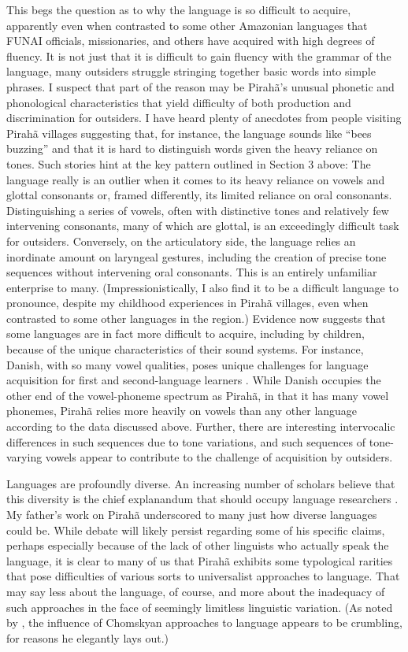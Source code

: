 \documentclass[output=paper,colorlinks,citecolor=brown
]{langscibook}
\begin{document}
    This begs the question as to why the language is so difficult to acquire, apparently even when contrasted to some other Amazonian languages that FUNAI officials, missionaries, and others have acquired with high degrees of fluency. It is not just that it is difficult to gain fluency with the grammar of the language, many outsiders struggle stringing together basic words into simple phrases. I suspect that part of the reason may be Pirahã’s unusual phonetic and phonological characteristics that yield difficulty of both production and discrimination for outsiders. I have heard plenty of anecdotes from people visiting Pirahã villages suggesting that, for instance, the language sounds like “bees buzzing” and that it is hard to distinguish words given the heavy reliance on tones. Such stories hint at the key pattern outlined in Section 3 above: The language really is an outlier when it comes to its heavy reliance on vowels and glottal consonants or, framed differently, its limited reliance on oral consonants. Distinguishing a series of vowels, often with distinctive tones and relatively few intervening consonants, many of which are glottal, is an exceedingly difficult task for outsiders. Conversely, on the articulatory side, the language relies an inordinate amount on laryngeal gestures, including the creation of precise tone sequences without intervening oral consonants. This is an entirely unfamiliar enterprise to many. (Impressionistically, I also find it to be a difficult language to pronounce, despite my childhood experiences in Pirahã villages, even when contrasted to some other languages in the region.) Evidence now suggests that some languages are in fact more difficult to acquire, including by children, because of the unique characteristics of their sound systems. For instance, Danish, with so many vowel qualities, poses unique challenges for language acquisition for first and second-language learners \citep{trecca2021danish}. While Danish occupies the other end of the vowel-phoneme spectrum as Pirahã, in that it has many vowel phonemes, Pirahã relies more heavily on vowels than any other language according to the data discussed above. Further, there are interesting intervocalic differences in such sequences due to tone variations, and such sequences of tone-varying vowels appear to contribute to the challenge of acquisition by outsiders.
    
    Languages are profoundly diverse. An increasing number of scholars believe that this diversity
    is the chief explanandum that should occupy language researchers \citep{evans2009myth}. My father’s work on Pirahã underscored to many just how diverse languages could be. While debate will likely persist regarding some of his specific claims, perhaps especially because of the lack of other linguists who actually speak the language, it is clear to many of us that Pirahã exhibits some typological rarities that pose difficulties of various sorts to universalist approaches to language. That may say less about the language, of course, and more about the inadequacy of such approaches in the face of seemingly limitless linguistic variation. (As noted by , the influence of Chomskyan approaches to language appears to be crumbling, for reasons he elegantly lays out.) 
    
\end{document}
